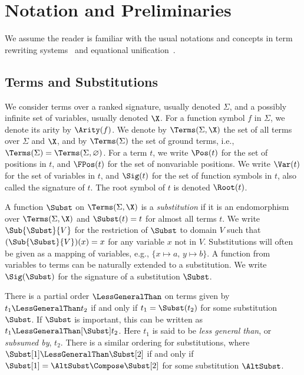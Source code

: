 \chapter{Notation and Preliminaries}\label{chap:prelims}

We assume the reader is familiar with the usual notations and concepts in term
rewriting systems~\cite{Term} and equational unification~\cite{BaaderSnyd-01}.

\section{Terms and Substitutions}\label{sec:terms-subs}

We consider terms over a ranked signature, usually denoted $\Sigma$, and a
possibly infinite set of variables, usually denoted $\X$. For a function symbol
$f$ in $\Sigma$, we denote its arity by $\Arity(f)$. We denote by
$\Terms(\Sigma, \X)$ the set of all terms over $\Sigma$ and $\X$, and by
$\Terms(\Sigma)$ the set of ground terms, i.e., $\Terms(\Sigma) =
\Terms(\Sigma, \varnothing)$. For a term $t$, we write $\Pos(t)$ for the set of
positions in $t$, and $\FPos(t)$ for the set of nonvariable positions. We write
$\Var(t)$ for the set of variables in $t$, and $\Sig(t)$ for the set of
function symbols in $t$, also called the signature of $t$. The root symbol of
$t$ is denoted $\Root(t)$.

A function $\Subst$ on $\Terms(\Sigma, \X)$ is a \emph{substitution} if it is
an endomorphism over $\Terms(\Sigma, \X)$ and $\Subst(t) = t$ for almost all
terms $t$. We write $\Sub{\Subst}{V}$ for the restriction of $\Subst$ to domain
$V$ such that $(\Sub{\Subst}{V})(x) = x$ for any variable $x$ not in $V$.
Substitutions will often be given as a mapping of variables, e.g., $\{ x
\mapsto a,\, y \mapsto b \}$. A function from variables to terms can be
naturally extended to a substitution. We write $\Sig(\Subst)$ for the signature
of a substitution $\Subst$.

There is a partial order $\LessGeneralThan$ on terms given by $t_1
\LessGeneralThan t_2$ if and only if $t_1 = \Subst(t_2)$ for some substitution
$\Subst$. If $\Subst$ is important, this can be written as $t_1
\LessGeneralThan[\Subst] t_2$. Here $t_1$ is said to be \emph{less general
than}, or \emph{subsumed by}, $t_2$. There is a similar ordering for
substitutions, where $\Subst[1] \LessGeneralThan \Subst[2]$ if and only if
$\Subst[1] = \AltSubst \Compose \Subst[2]$ for some substitution $\AltSubst$.

